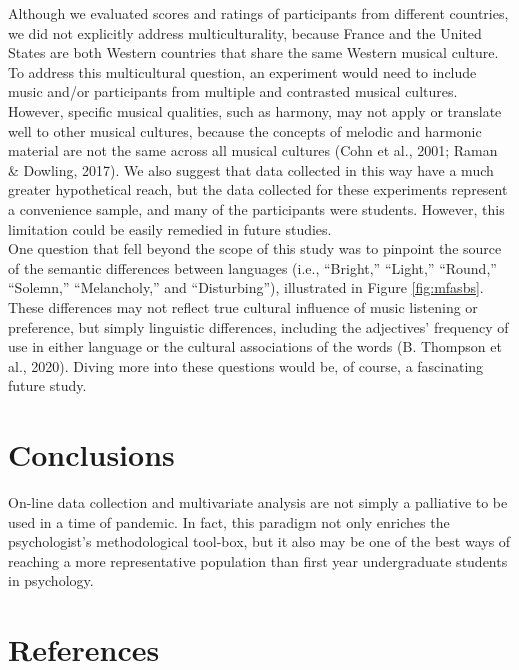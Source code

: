 \documentclass[
  english,
  man]{apa6}
\begin{document}
Although we evaluated scores and ratings of participants from different countries, we did not explicitly address multiculturality, because France and the United States are both Western countries that share the same Western musical culture. To address this multicultural question, an experiment would need to include music and/or participants from multiple and contrasted musical cultures. However, specific musical qualities, such as harmony, may not apply or translate well to other musical cultures, because the concepts of melodic and harmonic material are not the same across all musical cultures (Cohn et al., 2001; Raman \& Dowling, 2017). We also suggest that data collected in this way have a much greater hypothetical reach, but the data collected for these experiments represent a convenience sample, and many of the participants were students. However, this limitation could be easily remedied in future studies.\\
One question that fell beyond the scope of this study was to pinpoint the source of the semantic differences between languages (i.e., ``Bright,'' ``Light,'' ``Round,'' ``Solemn,'' ``Melancholy,'' and ``Disturbing''), illustrated in Figure \ref{fig:mfasbs}. These differences may not reflect true cultural influence of music listening or preference, but simply linguistic differences, including the adjectives' frequency of use in either language or the cultural associations of the words (B. Thompson et al., 2020). Diving more into these questions would be, of course, a fascinating future study.

\hypertarget{conclusions}{%
\section{Conclusions}\label{conclusions}}

On-line data collection and multivariate analysis are not simply a palliative to be used in a time of pandemic. In fact, this paradigm not only enriches the psychologist's methodological tool-box, but it also may be one of the best ways of reaching a more representative population than first year undergraduate students in psychology.

\newpage

\hypertarget{references}{%
\section{References}\label{references}}

\begingroup
\setlength{\parindent}{-0.5in}
\setlength{\leftskip}{0.5in}
\end{document}
